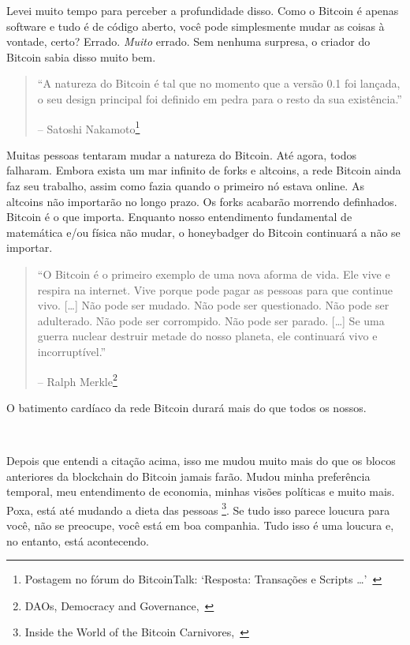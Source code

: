 Levei muito tempo para perceber a profundidade disso. Como o Bitcoin é apenas software e tudo é de código aberto, você pode simplesmente mudar as coisas à vontade, certo? Errado. \textit {Muito} errado. Sem nenhuma surpresa, o criador do Bitcoin sabia disso muito bem.

\begin{quotation}\begin{samepage}
\enquote{A natureza do Bitcoin é tal que no momento que a versão 0.1 foi lançada, o seu design principal foi definido em pedra para o resto da sua existência.}
\begin{flushright} -- Satoshi Nakamoto\footnote{Postagem no fórum do BitcoinTalk: `Resposta: Transações e Scripts \ldots'~\cite{satoshi-set-in-stone}}
\end{flushright}\end{samepage}\end{quotation}

Muitas pessoas tentaram mudar a natureza do Bitcoin. Até agora, todos falharam. Embora exista um mar infinito de forks e altcoins, a rede Bitcoin ainda faz seu trabalho, assim como fazia quando o primeiro nó estava online. As altcoins não importarão no longo prazo. Os forks acabarão morrendo definhados. Bitcoin é o que importa. Enquanto nosso entendimento fundamental de matemática e/ou física não mudar, o honeybadger do Bitcoin continuará a não se importar.


\begin{quotation}\begin{samepage}
\enquote{O Bitcoin é o primeiro exemplo de uma nova aforma de vida. Ele vive e respira na internet. Vive porque pode pagar as pessoas para que continue vivo. [\ldots] Não pode ser mudado. Não pode ser questionado. Não pode ser adulterado. Não pode ser corrompido. Não pode ser parado. [\ldots] Se uma guerra nuclear destruir metade do nosso planeta, ele continuará vivo e incorruptível.}
\begin{flushright} -- Ralph Merkle\footnote{DAOs, Democracy and
Governance,~\cite{merkle-dao}}
\end{flushright}\end{samepage}\end{quotation}

O batimento cardíaco da rede Bitcoin durará mais do que todos os nossos.

~

Depois que entendi a citação acima, isso me mudou muito mais do que os blocos anteriores da blockchain do Bitcoin jamais farão. Mudou minha preferência temporal, meu entendimento de economia, minhas visões políticas e muito mais. Poxa, está até mudando a dieta das pessoas \footnote{Inside the World of the Bitcoin
Carnivores,~\cite{carnivores}}. Se tudo isso parece loucura para você, não se preocupe, você está em boa companhia. Tudo isso é uma loucura e, no entanto, está acontecendo.


